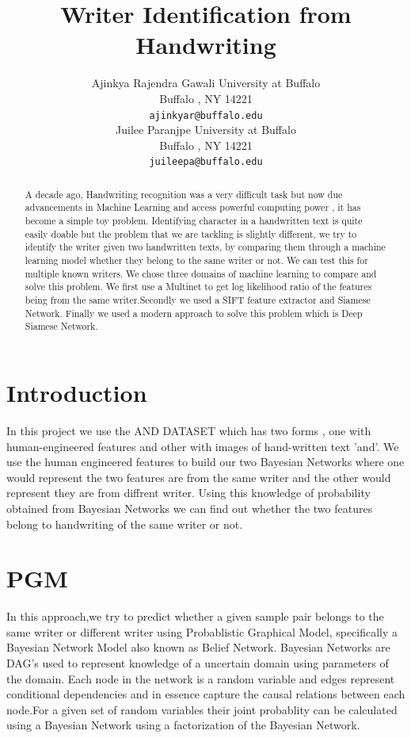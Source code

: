 \documentclass{article}
\title{Writer Identification from Handwriting}
\author{
  Ajinkya Rajendra Gawali
  University at Buffalo\\
  Buffalo , NY 14221 \\
  \texttt{ajinkyar@buffalo.edu} \\
   \And
  Juilee Paranjpe
  University at Buffalo\\
  Buffalo , NY 14221 \\
  \texttt{juileepa@buffalo.edu} \\
 }
\begin{document}

\maketitle

\begin{abstract}
   A decade ago, Handwriting recognition was a very difficult task but now due advancements in Machine Learning and access powerful computing power , it has become a simple toy problem. Identifying character in a handwritten text is quite easily doable but the problem that we are tackling is slightly different, we try to identify the writer given two handwritten texts, by comparing them through a machine learning model whether they belong to the same writer or not. We can test this for multiple known writers. We chose three domains of machine learning to compare and solve this problem. We first use a Multinet to get log likelihood ratio of the features being from the same writer.Secondly we used a SIFT feature extractor and Siamese Network.
   Finally we used a modern approach to solve this problem which is Deep Siamese Network.
\end{abstract}

\section{Introduction}
 In this project we use the AND DATASET which has two forms , one with human-engineered features and other with images of hand-written text 'and'. We use the human engineered features to build our two Bayesian Networks where one would represent the two features are from the same writer and the other would represent they are from diffrent writer. Using this knowledge of probability obtained from Bayesian Networks we can find out whether the two features belong to handwriting of the same writer or not.

\section{PGM}
    In this approach,we try to predict whether a given sample pair belongs to the same writer or different writer using Probablistic Graphical Model, specifically a Bayesian Network Model also known as Belief Network. Bayesian Networks are DAG's used to represent knowledge of a uncertain domain using parameters of the domain. Each node in the network is a random variable and edges represent conditional dependencies and in essence capture the causal relations between each node.For a given set of random variables their joint probablity can be calculated using a Bayesian Network using a factorization of the Bayesian Network.
    
\end{document}
